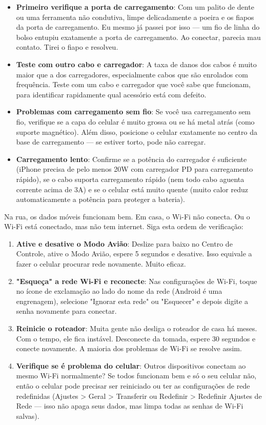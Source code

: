 \begin{itemize}
  \item \textbf{Primeiro verifique a porta de carregamento}: Com um palito de dente ou uma ferramenta não condutiva, limpe delicadamente a poeira e os fiapos da porta de carregamento. Eu mesmo já passei por isso — um fio de linha do bolso entupiu exatamente a porta de carregamento. Ao conectar, parecia mau contato. Tirei o fiapo e resolveu.
  \item \textbf{Teste com outro cabo e carregador}: A taxa de danos dos cabos é muito maior que a dos carregadores, especialmente cabos que são enrolados com frequência. Teste com um cabo e carregador que você sabe que funcionam, para identificar rapidamente qual acessório está com defeito.
  \item \textbf{Problemas com carregamento sem fio}: Se você usa carregamento sem fio, verifique se a capa do celular é muito grossa ou se há metal atrás (como suporte magnético). Além disso, posicione o celular exatamente no centro da base de carregamento — se estiver torto, pode não carregar.
  \item \textbf{Carregamento lento}: Confirme se a potência do carregador é suficiente (iPhone precisa de pelo menos 20W com carregador PD para carregamento rápido), se o cabo suporta carregamento rápido (nem todo cabo aguenta corrente acima de 3A) e se o celular está muito quente (muito calor reduz automaticamente a potência para proteger a bateria).
\end{itemize}


Na rua, os dados móveis funcionam bem. Em casa, o Wi-Fi não conecta. Ou o Wi-Fi está conectado, mas não tem internet. Siga esta ordem de verificação:

\begin{enumerate}
  \item \textbf{Ative e desative o Modo Avião}: Deslize para baixo no Centro de Controle, ative o Modo Avião, espere 5 segundos e desative. Isso equivale a fazer o celular procurar rede novamente. Muito eficaz.
  \item \textbf{"Esqueça" a rede Wi-Fi e reconecte}: Nas configurações de Wi-Fi, toque no ícone de exclamação ao lado do nome da rede (Android é uma engrenagem), selecione "Ignorar esta rede" ou "Esquecer" e depois digite a senha novamente para conectar.
  \item \textbf{Reinicie o roteador}: Muita gente não desliga o roteador de casa há meses. Com o tempo, ele fica instável. Desconecte da tomada, espere 30 segundos e conecte novamente. A maioria dos problemas de Wi-Fi se resolve assim.
  \item \textbf{Verifique se é problema do celular}: Outros dispositivos conectam ao mesmo Wi-Fi normalmente? Se todos funcionam bem e só o seu celular não, então o celular pode precisar ser reiniciado ou ter as configurações de rede redefinidas (Ajustes > Geral > Transferir ou Redefinir > Redefinir Ajustes de Rede — isso não apaga seus dados, mas limpa todas as senhas de Wi-Fi salvas).
\end{enumerate}

